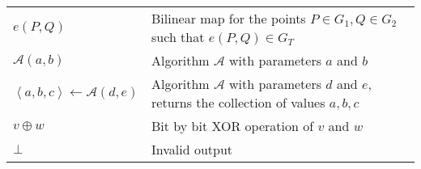 \documentclass[master=eelt,masteroption=em]{kulemt}
\theoremstyle{plain}
\theoremstyle{definition}
\begin{document}
\begin{flushleft}
 \renewcommand{\arraystretch}{1.1}
 \begin{tabularx}{\textwidth}{@{}p{30mm}X@{}}
  $e \left( P, Q \right)$ & Bilinear map  for the points $P \in G_1, Q \in G_2$ such that ${e \left( P, Q \right) \in G_T}$ \\
  $\mathcal{A} \left( a, b \right)$ & Algorithm $\mathcal{A}$ with parameters $a$ and $b$ \\
  $\left< a, b, c \right> \leftarrow \mathcal{A}( d, e )$ & Algorithm $\mathcal{A}$ with parameters $d$ and $e$, returns the collection of values $a, b, c$ \\
  $v \oplus w$ & Bit by bit XOR operation of $v$ and $w$ \\
  $\bot$ & Invalid output \\
  \end{tabularx}
\end{flushleft}

\mainmatter








\appendixpage*          %
\appendix

%



\backmatter


\end{document}
